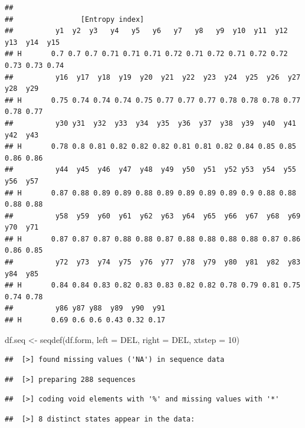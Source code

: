 \documentclass[
]{book}
\newenvironment{Shaded}{\begin{snugshade}}{\end{snugshade}}
\newcommand{\AttributeTok}[1]{\textcolor[rgb]{0.77,0.63,0.00}{#1}}
\newcommand{\DecValTok}[1]{\textcolor[rgb]{0.00,0.00,0.81}{#1}}
\newcommand{\FunctionTok}[1]{\textcolor[rgb]{0.00,0.00,0.00}{#1}}
\newcommand{\NormalTok}[1]{#1}
\newcommand{\OtherTok}[1]{\textcolor[rgb]{0.56,0.35,0.01}{#1}}
\newcommand{\StringTok}[1]{\textcolor[rgb]{0.31,0.60,0.02}{#1}}
\begin{document}
\begin{verbatim}
## 
##                [Entropy index]
##          y1  y2  y3   y4   y5   y6   y7   y8   y9  y10  y11  y12  y13  y14  y15
## H       0.7 0.7 0.7 0.71 0.71 0.71 0.72 0.71 0.72 0.71 0.72 0.72 0.73 0.73 0.74
##          y16  y17  y18  y19  y20  y21  y22  y23  y24  y25  y26  y27  y28  y29
## H       0.75 0.74 0.74 0.74 0.75 0.77 0.77 0.77 0.78 0.78 0.78 0.77 0.78 0.77
##          y30 y31  y32  y33  y34  y35  y36  y37  y38  y39  y40  y41  y42  y43
## H       0.78 0.8 0.81 0.82 0.82 0.82 0.81 0.81 0.82 0.84 0.85 0.85 0.86 0.86
##          y44  y45  y46  y47  y48  y49  y50  y51  y52 y53  y54  y55  y56  y57
## H       0.87 0.88 0.89 0.89 0.88 0.89 0.89 0.89 0.89 0.9 0.88 0.88 0.88 0.88
##          y58  y59  y60  y61  y62  y63  y64  y65  y66  y67  y68  y69  y70  y71
## H       0.87 0.87 0.87 0.88 0.88 0.87 0.88 0.88 0.88 0.88 0.87 0.86 0.86 0.85
##          y72  y73  y74  y75  y76  y77  y78  y79  y80  y81  y82  y83  y84  y85
## H       0.84 0.84 0.83 0.82 0.83 0.83 0.82 0.82 0.78 0.79 0.81 0.75 0.74 0.78
##          y86 y87 y88  y89  y90  y91
## H       0.69 0.6 0.6 0.43 0.32 0.17
\end{verbatim}

\begin{Shaded}
\begin{Highlighting}[]
\NormalTok{df.seq }\OtherTok{\textless{}{-}} \FunctionTok{seqdef}\NormalTok{(df.form,}
                 \AttributeTok{left =} \StringTok{\textquotesingle{}DEL\textquotesingle{}}\NormalTok{,}
                 \AttributeTok{right =} \StringTok{\textquotesingle{}DEL\textquotesingle{}}\NormalTok{,}
                 \AttributeTok{xtstep =} \DecValTok{10}\NormalTok{)}
\end{Highlighting}
\end{Shaded}

\begin{verbatim}
##  [>] found missing values ('NA') in sequence data
\end{verbatim}

\begin{verbatim}
##  [>] preparing 288 sequences
\end{verbatim}

\begin{verbatim}
##  [>] coding void elements with '%' and missing values with '*'
\end{verbatim}

\begin{verbatim}
##  [>] 8 distinct states appear in the data:
\end{verbatim}
\end{document}
